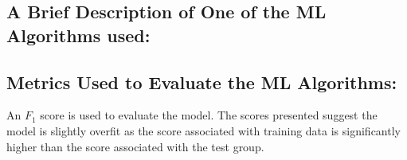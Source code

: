 \documentclass[]{article}
\begin{document}
\subsection*{A Brief Description of One of the ML Algorithms used:}


\subsection*{Metrics Used to Evaluate the ML Algorithms:}
An $F_1$ score is used to evaluate the model. 
The scores presented suggest the model is slightly overfit as the score associated with training data is significantly higher than the score associated with the test group.
\end{document}
